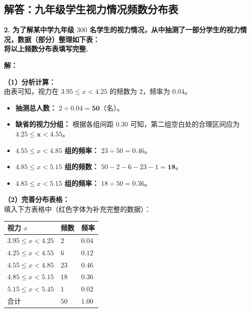 \newpage

\newpage

\subsection{解答：九年级学生视力情况频数分布表}

\vspace{0.6cm}

\textbf{2. 为了解某中学九年级 $300$ 名学生的视力情况，从中抽测了一部分学生的视力情况，数据（部分）整理如下表：}\\
\textbf{将以上频数分布表填写完整.}

\vspace{0.4cm}

\textbf{解：}

\textbf{（1）分析计算：} \\
由表可知，视力在 $3.95 \leqslant x < 4.25$ 的频数为 $2$，频率为 $0.04$。
\begin{itemize}
  \item \textbf{抽测总人数：} $2 \div 0.04 = \boldsymbol{50}$（名）。
  \item \textbf{缺省的视力分组：} 根据各组间距 $0.30$ 可知，第二组空白处的合理区间应为 $\boldsymbol{4.25 \leqslant x < 4.55}$。
  \item \textbf{$4.55 \leqslant x < 4.85$ 组的频率：} $23 \div 50 = \boldsymbol{0.46}$。
  \item \textbf{$4.85 \leqslant x < 5.15$ 组的频数：} $50 - 2 - 6 - 23 - 1 = \boldsymbol{18}$。
  \item \textbf{$4.85 \leqslant x < 5.15$ 组的频率：} $18 \div 50 = \boldsymbol{0.36}$。
\end{itemize}

\textbf{（2）完善分布表格：} \\
填入下方表格中（红色字体为补充完整的数据）：

\vspace{0.2cm}
\begin{center}
\renewcommand{\arraystretch}{1.5}
\begin{tabular}{|>{\centering\arraybackslash}p{4cm}|>{\centering\arraybackslash}p{3cm}|>{\centering\arraybackslash}p{3cm}|}
  \hline
  \cellcolor{gray!15} 视力 $x$ & \cellcolor{gray!15} 频数 & \cellcolor{gray!15} 频率 \\
  \hline
  $3.95 \leqslant x < 4.25$ & $2$ & $0.04$ \\
  \hline
  \textbf{\textcolor{red!70!black}{$4.25 \leqslant x < 4.55$}} & $6$ & $0.12$ \\
  \hline
  $4.55 \leqslant x < 4.85$ & $23$ & \textbf{\textcolor{red!70!black}{$0.46$}} \\
  \hline
  $4.85 \leqslant x < 5.15$ & \textbf{\textcolor{red!70!black}{$18$}} & \textbf{\textcolor{red!70!black}{$0.36$}} \\
  \hline
  $5.15 \leqslant x < 5.45$ & $1$ & $0.02$ \\
  \hline
  合计 & \textbf{\textcolor{red!70!black}{$50$}} & $1.00$ \\
  \hline
\end{tabular}
\end{center}

